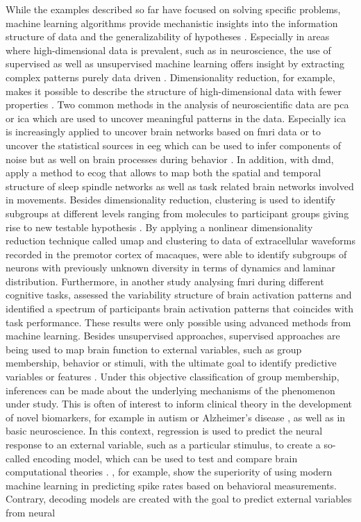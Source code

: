 While the examples described so far have focused on solving specific problems, machine learning algorithms provide mechanistic insights into the information structure of data and the generalizability of hypotheses \cite{Hastie2009}. Especially in areas where high-dimensional data is prevalent, such as in neuroscience, the use of supervised as well as unsupervised machine learning offers insight by extracting complex patterns purely data driven \cite{Bzdok2017}. Dimensionality reduction, for example, makes it possible to describe the structure of high-dimensional data with fewer properties \cite{Cunningham2014}. Two common methods in the analysis of neuroscientific data are \gls{pca} or \gls{ica} which are used to uncover meaningful patterns in the data. Especially \gls{ica} is increasingly applied to uncover brain networks based on \gls{fmri} data \cite{Varoquaux2010} or to uncover the statistical sources in \gls{eeg} which can be used to infer components of noise but as well on brain processes during behavior \cite{Strophal2018}.  In addition, with \gls{dmd}, \citeauthor{Brunton2016} \cite{Brunton2016} apply a method to \gls{ecog} that allows to map both the spatial and temporal structure of sleep spindle networks as well as task related brain networks involved in movements. Besides dimensionality reduction, clustering is used to identify subgroups at different levels ranging from molecules to participant groups giving rise to new testable hypothesis \cite{Vu1601}. By applying a nonlinear dimensionality reduction technique called \gls{umap} and clustering to data of extracellular waveforms recorded in the premotor cortex of macaques, \citeauthor{Lee2021} \cite{Lee2021} were able to identify subgroups of neurons with previously unknown diversity in terms of dynamics and laminar distribution. Furthermore, in another study analysing \gls{fmri} during different cognitive tasks, \citeauthor{Hawco2021} \cite{Hawco2021} assessed the variability structure of brain activation patterns and identified a spectrum of participants brain activation patterns that coincides with task performance. These results were only possible using advanced methods from machine learning. Besides unsupervised approaches, supervised approaches are being used to map brain function to external variables, such as group membership, behavior or stimuli, with the ultimate goal to identify predictive variables or features \cite{Glaser2019}. Under this objective classification of group membership, inferences can be made about the underlying mechanisms of the phenomenon under study. This is often of interest to inform clinical theory in the development of novel biomarkers, for example in autism \cite{Deshpande2013} or Alzheimer's disease \cite{Farina2020}, as well as in basic neuroscience. In this context, regression is used to predict the neural response to an external variable, such as a particular stimulus, to create a so-called encoding model, which can be used to test and compare brain computational theories \cite{Kriegskorte2019, Naselaris2011}. \citeauthor{Benjamin2018} \cite{Benjamin2018}, for example, show the superiority of using modern machine learning in predicting spike rates based on behavioral measurements. Contrary, decoding models are created with the goal to predict external variables from neural 